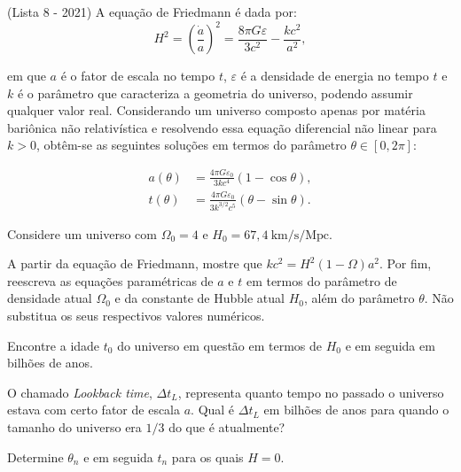 \documentclass[11pt]{article}
\begin{document}
\begin{pproblem}(Lista 8 - 2021)
    A equação de Friedmann é dada por:
    \begin{equation}
        H^2 = \left( \frac{\dot{a}}{a} \right)^2 = \frac{8\pi G \varepsilon}{3c^2} - \frac{k c^2}{a^2},
    \end{equation}

    em que \(a\) é o fator de escala no tempo \(t\), \(\varepsilon\) é a densidade de energia no tempo \(t\) e \(k\) é o parâmetro que caracteriza a geometria do universo, podendo assumir qualquer valor real. Considerando um universo composto apenas por matéria bariônica não relativística e resolvendo essa equação diferencial não linear para \(k > 0\), obtêm-se as seguintes soluções em termos do parâmetro \(\theta \in [0, 2\pi]\):

    \begin{align}
        a(\theta) &= \frac{4\pi G \varepsilon_0}{3k c^4} \left( 1 - \cos\theta \right), \\
        t(\theta) &= \frac{4\pi G \varepsilon_0}{3k^{3/2}c^5} \left( \theta - \sin\theta \right).
    \end{align}

    Considere um universo com \(\Omega_0 = 4\) e \(H_0 = 67,4 \ \text{km/s/Mpc}\).

    \begin{alternativas}
        \item A partir da equação de Friedmann, mostre que \(k c^2 = H^2 \left( 1 - \Omega \right) a^2\). Por fim, reescreva as equações paramétricas de \(a\) e \(t\) em termos do parâmetro de densidade atual \(\Omega_0\) e da constante de Hubble atual \(H_0\), além do parâmetro \(\theta\). Não substitua os seus respectivos valores numéricos.
        
        \item Encontre a idade \(t_0\) do universo em questão em termos de \(H_0\) e em seguida em bilhões de anos.
        
        \item O chamado \textit{Lookback time}, \(\Delta t_L\), representa quanto tempo no passado o universo estava com certo fator de escala \(a\). Qual é \(\Delta t_L\) em bilhões de anos para quando o tamanho do universo era \(1/3\) do que é atualmente?
        
        \item Determine \(\theta_n\) e em seguida \(t_n\) para os quais \(H = 0\).
    \end{alternativas}
\end{pproblem}
\end{document}
